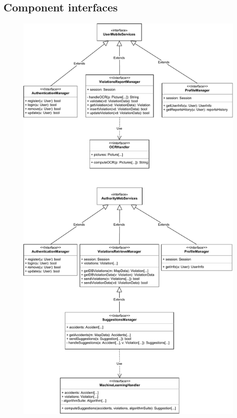 \documentclass[12pt,a4paper]{article}
\begin{document}
\subsection{Component interfaces}
\begin{figure}[H]
		\centering
		\includegraphics[width=0.7\linewidth]{../assets/images/component_interfaces1.pdf}
	\end{figure}
\end{document}
